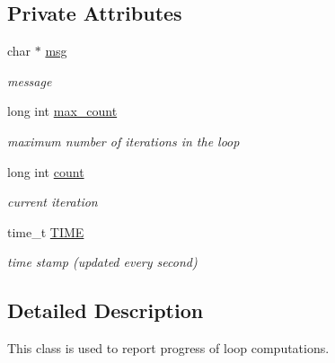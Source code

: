 \subsection*{Private Attributes}
\begin{DoxyCompactItemize}
\item 
\hypertarget{classProgress_a7eeeaec06e0ab3c1fc871ccb225ede3d}{
char $\ast$ \hyperlink{classProgress_a7eeeaec06e0ab3c1fc871ccb225ede3d}{msg}}
\label{classProgress_a7eeeaec06e0ab3c1fc871ccb225ede3d}

\begin{DoxyCompactList}\small\item\em message \end{DoxyCompactList}\item 
\hypertarget{classProgress_a9cfb7b6b93778e9c617c38ab26d3d0a0}{
long int \hyperlink{classProgress_a9cfb7b6b93778e9c617c38ab26d3d0a0}{max\_\-count}}
\label{classProgress_a9cfb7b6b93778e9c617c38ab26d3d0a0}

\begin{DoxyCompactList}\small\item\em maximum number of iterations in the loop \end{DoxyCompactList}\item 
\hypertarget{classProgress_af7e775f01228c66c3ee7617a2ba1ab5c}{
long int \hyperlink{classProgress_af7e775f01228c66c3ee7617a2ba1ab5c}{count}}
\label{classProgress_af7e775f01228c66c3ee7617a2ba1ab5c}

\begin{DoxyCompactList}\small\item\em current iteration \end{DoxyCompactList}\item 
\hypertarget{classProgress_aac96c2b090cf1fe16e16c9a4be676888}{
time\_\-t \hyperlink{classProgress_aac96c2b090cf1fe16e16c9a4be676888}{TIME}}
\label{classProgress_aac96c2b090cf1fe16e16c9a4be676888}

\begin{DoxyCompactList}\small\item\em time stamp (updated every second) \end{DoxyCompactList}\end{DoxyCompactItemize}


\subsection{Detailed Description}
This class is used to report progress of loop computations. 

